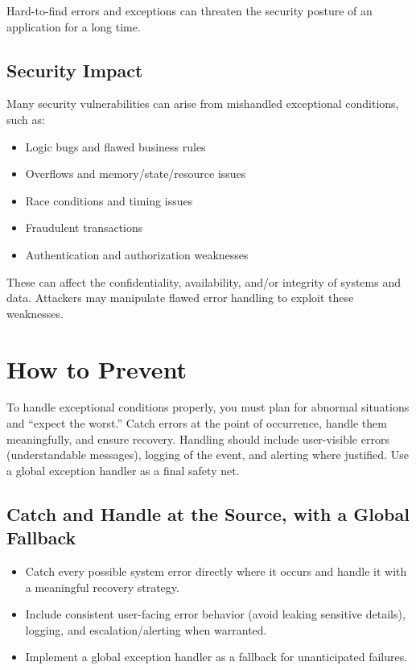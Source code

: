 \documentclass[11pt]{article}
\begin{document}
Hard-to-find errors and exceptions can threaten the security posture of an application for a long time.

\subsection{Security Impact}
Many security vulnerabilities can arise from mishandled exceptional conditions, such as:
\begin{itemize}
  \item Logic bugs and flawed business rules
  \item Overflows and memory/state/resource issues
  \item Race conditions and timing issues
  \item Fraudulent transactions
  \item Authentication and authorization weaknesses
\end{itemize}

These can affect the confidentiality, availability, and/or integrity of systems and data. Attackers may manipulate flawed error handling to exploit these weaknesses.

\section{How to Prevent}

\begin{principlebox}
To handle exceptional conditions properly, you must plan for abnormal situations and ``expect the worst.'' Catch errors at the point of occurrence, handle them meaningfully, and ensure recovery. Handling should include user-visible errors (understandable messages), logging of the event, and alerting where justified. Use a global exception handler as a final safety net.
\end{principlebox}

\subsection{Catch and Handle at the Source, with a Global Fallback}
\begin{itemize}
  \item Catch every possible system error directly where it occurs and handle it with a meaningful recovery strategy.
  \item Include consistent user-facing error behavior (avoid leaking sensitive details), logging, and escalation/alerting when warranted.
  \item Implement a global exception handler as a fallback for unanticipated failures.
\end{itemize}
\end{document}

